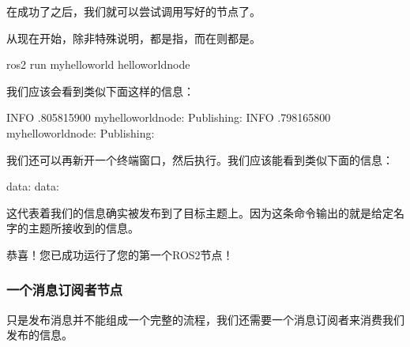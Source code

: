 \documentclass[letterpaper,10pt,english]{sphinxmanual}
\begin{document}
\sphinxAtStartPar
在成功了之后，我们就可以尝试调用写好的节点了。

\sphinxAtStartPar
从现在开始，除非特殊说明，都是指，而在则都是。

\begin{sphinxVerbatim}[commandchars=\\\{\}]
ros2 run my\PYGZus{}hello\PYGZus{}world hello\PYGZus{}world\PYGZus{}node
\end{sphinxVerbatim}

\sphinxAtStartPar
我们应该会看到类似下面这样的信息：

\begin{sphinxVerbatim}[commandchars=\\\{\}]
\PYG{o}{[}INFO\PYG{o}{]} \PYG{o}{[}.805815900\PYG{o}{]} \PYG{o}{[}my\PYGZus{}hello\PYGZus{}world\PYGZus{}node\PYG{o}{]}: Publishing: 
\PYG{o}{[}INFO\PYG{o}{]} \PYG{o}{[}.798165800\PYG{o}{]} \PYG{o}{[}my\PYGZus{}hello\PYGZus{}world\PYGZus{}node\PYG{o}{]}: Publishing: 
\end{sphinxVerbatim}

\sphinxAtStartPar
我们还可以再新开一个终端窗口，然后执行。我们应该能看到类似下面的信息：

\begin{sphinxVerbatim}[commandchars=\\\{\}]
data: 
\PYGZhy{}\PYGZhy{}\PYGZhy{}
data: 
\PYGZhy{}\PYGZhy{}\PYGZhy{}
\end{sphinxVerbatim}

\sphinxAtStartPar
这代表着我们的信息确实被发布到了目标主题上。因为这条命令输出的就是给定名字的主题所接收到的信息。

\sphinxAtStartPar
恭喜！您已成功运行了您的第一个ROS2节点！


\subsubsection{一个消息订阅者节点}
\label{\detokenize{chapter_rl_sys/ros_code_ex:id7}}
\sphinxAtStartPar
只是发布消息并不能组成一个完整的流程，我们还需要一个消息订阅者来消费我们发布的信息。
\end{document}
